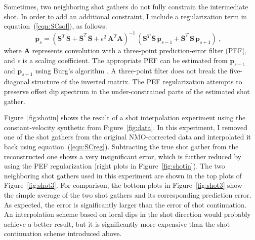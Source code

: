   Sometimes, two neighboring shot gathers do not fully constrain the
  intermediate shot. In order to add an additional constraint, I
  include a regularization term in equation~(\ref{eqn:SCsol}), as
  follows:
  \begin{equation}
    \label{eqn:SCreg}
    \mathbf{p}_s = \left(
      \mathbf{S}^T\,\mathbf{S} +
      \mathbf{\bar{S}}^T\,\mathbf{\bar{S}} + 
        \epsilon^2\,\mathbf{A}^T\mathbf{A}
    \right)^{-1}\,
    \left(\mathbf{S}^T\,\mathbf{\bar{S}}\,\mathbf{p}_{s-1} +
      \mathbf{\bar{S}}^T\,\mathbf{S}\,\mathbf{p}_{s+1}\right)\;,
  \end{equation}
  where $\mathbf{A}$ represents convolution with a three-point
  prediction-error filter (PEF), and $\epsilon$ is a scaling
  coefficient. The appropriate PEF can be estimated from
  $\mathbf{p}_{s-1}$ and $\mathbf{p}_{s+1}$ using Burg's algorithm
  \cite[]{GEO37-02-03750376,Burg.sepphd.6,Claerbout.fgdp.76}. A
  three-point filter does not break the five-diagonal structure
  of the inverted matrix.  The PEF regularization attempts to preserve
  offset dip spectrum in the under-constrained parts of the estimated
  shot gather.
  
  Figure~\ref{fig:shotin} shows the result of a shot interpolation
  experiment using the constant-velocity synthetic from
  Figure~\ref{fig:data}. In this experiment, I removed one of the
  shot gathers from the original NMO-corrected data and interpolated
  it back using equation~(\ref{eqn:SCreg}). Subtracting the true shot
  gather from the reconstructed one shows a very insignificant error,
  which is further reduced by using the PEF regularization (right
  plots in Figure~\ref{fig:shotin}).  The two neighboring shot gathers
  used in this experiment are shown in the top plots of
  Figure~\ref{fig:shot3}.  For comparison, the bottom plots in
  Figure~\ref{fig:shot3} show the simple average of the two shot
  gathers and its corresponding prediction error. As expected, the
  error is significantly larger than the error of shot
  continuation. An interpolation scheme based on local dips in the
  shot direction would probably achieve a better result, but it is
  significantly more expensive than the shot continuation scheme
  introduced above.
  
 
